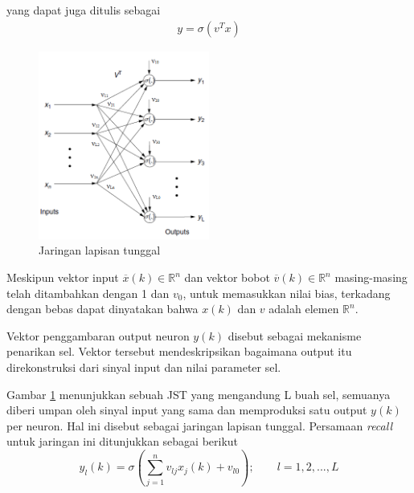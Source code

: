 yang dapat juga ditulis sebagai
\vspace{-2em}
\begin{equation} \label{eq:3:matriksfinal}
\begin{split}
y = \sigma(v^Tx)
\end{split}
\end{equation}

\begin{figure}[!h]
	\centering
	\includegraphics[width=0.5\textwidth]{figures/jstTunggal}
	\caption{Jaringan lapisan tunggal \cite{NNControlBook}}
	\label{fig:3:jstTunggal}
\end{figure}
Meskipun vektor input $\overline{x}(k) \in \mathbb{R}^n $ dan vektor bobot $\overline{v}(k) \in \mathbb{R}^n $ masing-masing telah ditambahkan dengan 1 dan $v_0$, untuk memasukkan nilai bias, terkadang dengan bebas dapat dinyatakan bahwa $x(k)$ dan $v$ adalah elemen $\mathbb{R}^n$.

Vektor penggambaran output neuron $y(k)$ disebut sebagai mekanisme penarikan sel. Vektor tersebut mendeskripsikan bagaimana output itu direkonstruksi dari sinyal input dan nilai parameter sel.

Gambar \ref{fig:3:jstTunggal} menunjukkan sebuah JST yang mengandung L buah sel, semuanya diberi umpan oleh sinyal input yang sama dan memproduksi satu output $y(k)$ per neuron. Hal ini disebut sebagai jaringan lapisan tunggal. Persamaan \textit{recall} untuk jaringan ini ditunjukkan sebagai berikut
\vspace{0em}
\begin{equation} \label{eq:3:recall}
y_l(k) = \sigma \left( \sum_{j=1}^{n}v_{lj}x_j(k)+v_{l0} \right); \qquad l = 1,2,...,L
\end{equation}

